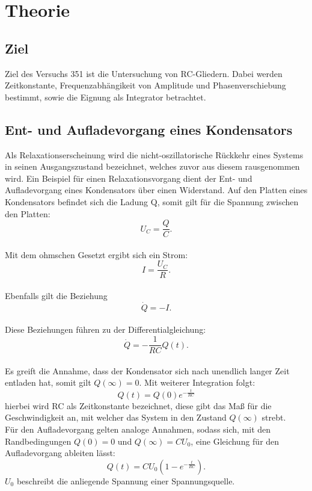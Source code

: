 \section{Theorie}
\label{sec:Theorie}
\subsection{Ziel}
Ziel des Versuchs 351 ist die Untersuchung von RC-Gliedern.
 Dabei werden Zeitkonstante, Frequenzabhängikeit von Amplitude und Phasenverschiebung bestimmt, sowie die Eignung als Integrator betrachtet.
\subsection{Ent- und Aufladevorgang eines Kondensators}
Als Relaxationserscheinung wird die nicht-oszillatorische Rückkehr eines Systems in seinen Ausgangszustand bezeichnet, welches zuvor aus diesem rausgenommen wird.
Ein Beispiel für einen Relaxationsvorgang dient der Ent- und Aufladevorgang eines Kondensators über einen Widerstand.
Auf den Platten eines Kondensators befindet sich die Ladung Q, somit gilt für die Spannung zwischen den Platten:\\
\begin{equation}
  U_C=\frac{Q}{C}.
\end{equation}\\
Mit dem ohmschen Gesetzt ergibt sich ein Strom:\\
\begin{equation}
  I=\frac{U_C}{R}.
\end{equation}\\
Ebenfalls gilt die Beziehung
\begin{equation}
  \dot Q= -I.
\end{equation}\\
Diese Beziehungen führen zu der Differentialgleichung:
\begin{equation}
  \dot Q= -\frac{1}{RC}  Q(t).
\end{equation}\\
Es greift die Annahme, dass der Kondensator sich nach unendlich langer Zeit entladen hat, somit gilt $Q(\infty)=0$. Mit weiterer Integration folgt:
\begin{equation}
  Q(t)=Q(0)e^{-\frac{t}{RC}}\label{eqn:entladung}
\end{equation}
hierbei wird RC als Zeitkonstante bezeichnet, diese gibt das Maß für die Geschwindigkeit an, mit welcher das System in den Zustand $Q(\infty)$ strebt.\\
Für den Aufladevorgang gelten analoge Annahmen, sodass sich, mit den Randbedingungen $Q(0)=0$ und $Q(\infty)=CU_0$, eine Gleichung für den Aufladevorgang ableiten lässt:
\begin{equation}
  Q(t)=CU_0(1-e^{-\frac{t}{RC}}).\label{eqn:aufladung}
  \end{equation}
  $U_0$ beschreibt die anliegende Spannung einer Spannungsquelle.
